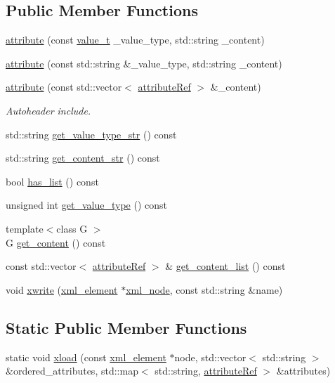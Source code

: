 \subsection*{Public Member Functions}
\begin{DoxyCompactItemize}
\item 
\hyperlink{structattribute_a918c83ed0432675e9679f57c1233147e}{attribute} (const \hyperlink{structattribute_a96d7b81ba16957b777d234cf215f004d}{value\+\_\+t} \+\_\+value\+\_\+type, std\+::string \+\_\+content)
\item 
\hyperlink{structattribute_a6bb99da6a48c7255b6259a112a998a1e}{attribute} (const std\+::string \&\+\_\+value\+\_\+type, std\+::string \+\_\+content)
\item 
\hyperlink{structattribute_aa5ef8a27be9ea9a40d57a2c92ff68e3f}{attribute} (const std\+::vector$<$ \hyperlink{library__manager_8hpp_a46399d2eacc03fb10f84fb33987ab8e3}{attribute\+Ref} $>$ \&\+\_\+content)
\begin{DoxyCompactList}\small\item\em Autoheader include. \end{DoxyCompactList}\item 
std\+::string \hyperlink{structattribute_a6d201447a5f5565c639c328ef5ef7e5c}{get\+\_\+value\+\_\+type\+\_\+str} () const
\item 
std\+::string \hyperlink{structattribute_abe1be3f2ea1fea96b490e4e0d12da955}{get\+\_\+content\+\_\+str} () const
\item 
bool \hyperlink{structattribute_abecb051f6ca4b712e18893876004f4d8}{has\+\_\+list} () const
\item 
unsigned int \hyperlink{structattribute_a82221bc27c1c3af4df3610f7b81307eb}{get\+\_\+value\+\_\+type} () const
\item 
{\footnotesize template$<$class G $>$ }\\G \hyperlink{structattribute_ae2d2ed4abd4d9c2f34a6f21229ab62ca}{get\+\_\+content} () const
\item 
const std\+::vector$<$ \hyperlink{library__manager_8hpp_a46399d2eacc03fb10f84fb33987ab8e3}{attribute\+Ref} $>$ \& \hyperlink{structattribute_a48846ecae25fc8c990c01ba21de1ba7b}{get\+\_\+content\+\_\+list} () const
\item 
void \hyperlink{structattribute_a0e1018c57c6411e0994c8d2653ea3593}{xwrite} (\hyperlink{classxml__element}{xml\+\_\+element} $\ast$\hyperlink{classxml__node}{xml\+\_\+node}, const std\+::string \&name)
\end{DoxyCompactItemize}
\subsection*{Static Public Member Functions}
\begin{DoxyCompactItemize}
\item 
static void \hyperlink{structattribute_a6566479d56d67782449458532846cfc3}{xload} (const \hyperlink{classxml__element}{xml\+\_\+element} $\ast$node, std\+::vector$<$ std\+::string $>$ \&ordered\+\_\+attributes, std\+::map$<$ std\+::string, \hyperlink{library__manager_8hpp_a46399d2eacc03fb10f84fb33987ab8e3}{attribute\+Ref} $>$ \&attributes)
\end{DoxyCompactItemize}
